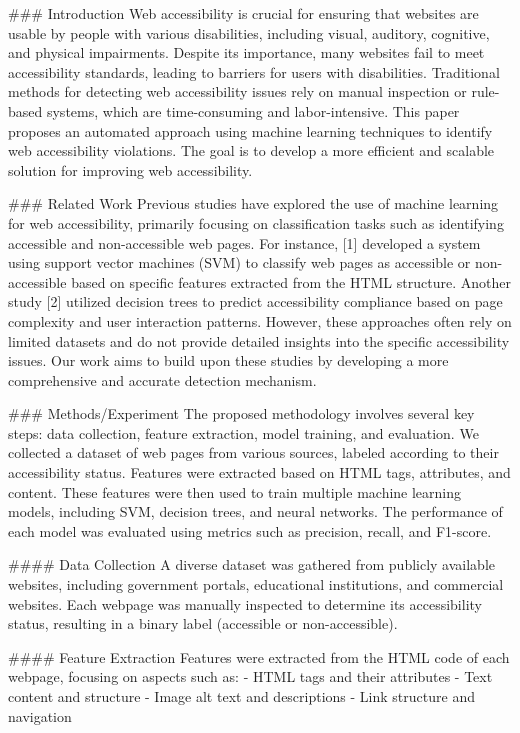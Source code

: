 ### Introduction
Web accessibility is crucial for ensuring that websites are usable by people with various disabilities, including visual, auditory, cognitive, and physical impairments. Despite its importance, many websites fail to meet accessibility standards, leading to barriers for users with disabilities. Traditional methods for detecting web accessibility issues rely on manual inspection or rule-based systems, which are time-consuming and labor-intensive. This paper proposes an automated approach using machine learning techniques to identify web accessibility violations. The goal is to develop a more efficient and scalable solution for improving web accessibility.

### Related Work
Previous studies have explored the use of machine learning for web accessibility, primarily focusing on classification tasks such as identifying accessible and non-accessible web pages. For instance, [1] developed a system using support vector machines (SVM) to classify web pages as accessible or non-accessible based on specific features extracted from the HTML structure. Another study [2] utilized decision trees to predict accessibility compliance based on page complexity and user interaction patterns. However, these approaches often rely on limited datasets and do not provide detailed insights into the specific accessibility issues. Our work aims to build upon these studies by developing a more comprehensive and accurate detection mechanism.

### Methods/Experiment
The proposed methodology involves several key steps: data collection, feature extraction, model training, and evaluation. We collected a dataset of web pages from various sources, labeled according to their accessibility status. Features were extracted based on HTML tags, attributes, and content. These features were then used to train multiple machine learning models, including SVM, decision trees, and neural networks. The performance of each model was evaluated using metrics such as precision, recall, and F1-score.

#### Data Collection
A diverse dataset was gathered from publicly available websites, including government portals, educational institutions, and commercial websites. Each webpage was manually inspected to determine its accessibility status, resulting in a binary label (accessible or non-accessible).

#### Feature Extraction
Features were extracted from the HTML code of each webpage, focusing on aspects such as:
- HTML tags and their attributes
- Text content and structure
- Image alt text and descriptions
- Link structure and navigation

